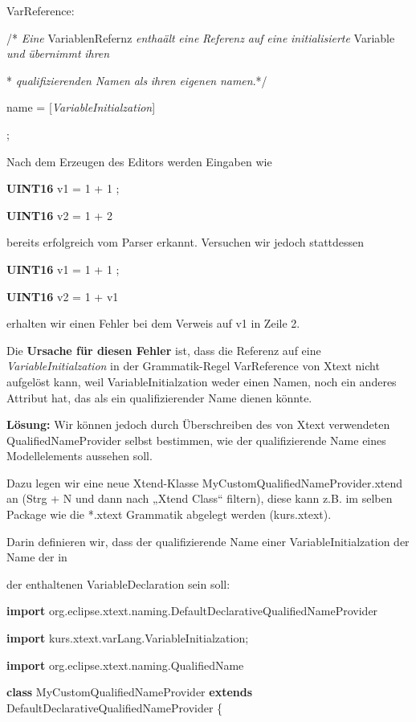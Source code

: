 \documentclass[a4]{article}
\begin{document}
VarReference:

/* \emph{Eine} VariablenRefernz \emph{enthaält} \emph{eine}
\emph{Referenz} \emph{auf} \emph{eine} \emph{initialisierte} Variable
\emph{und} \emph{übernimmt} \emph{ihren}

* \emph{qualifizierenden} \emph{Namen} \emph{als} \emph{ihren}
\emph{eigenen} \emph{namen}.*/

name = {[}\emph{VariableInitialzation}{]}

;

Nach dem Erzeugen des Editors werden Eingaben wie

\textbf{UINT16} v1 = 1 + 1 ;

\textbf{UINT16} v2 = 1 + 2

bereits erfolgreich vom Parser erkannt. Versuchen wir jedoch stattdessen

\textbf{UINT16} v1 = 1 + 1 ;

\textbf{UINT16} v2 = 1 + v1

erhalten wir einen Fehler bei dem Verweis auf v1 in Zeile 2.

Die \textbf{Ursache für diesen Fehler }ist, dass die Referenz auf eine
\emph{VariableInitialzation} in der Grammatik-Regel VarReference von
Xtext nicht aufgelöst kann, weil VariableInitialzation weder einen
Namen, noch ein anderes Attribut hat, das als ein qualifizierender Name
dienen könnte.

\textbf{Lösung: }Wir können jedoch durch Überschreiben des von Xtext
verwendeten QualifiedNameProvider selbst bestimmen, wie der
qualifizierende Name eines Modellelements aussehen soll.

Dazu legen wir eine neue Xtend-Klasse
MyCustomQualifiedNameProvider.xtend an (Strg + N und dann nach „Xtend
Class`` filtern), diese kann z.B. im selben Package wie die *.xtext
Grammatik abgelegt werden (kurs.xtext).

Darin definieren wir, dass der qualifizierende Name einer
VariableInitialzation der Name der in

der enthaltenen VariableDeclaration sein soll:

\textbf{import}
org.eclipse.xtext.naming.DefaultDeclarativeQualifiedNameProvider

\textbf{import} kurs.xtext.varLang.VariableInitialzation;

\textbf{import} org.eclipse.xtext.naming.QualifiedName

\textbf{class} MyCustomQualifiedNameProvider \textbf{extends}
DefaultDeclarativeQualifiedNameProvider \{
\end{document}
